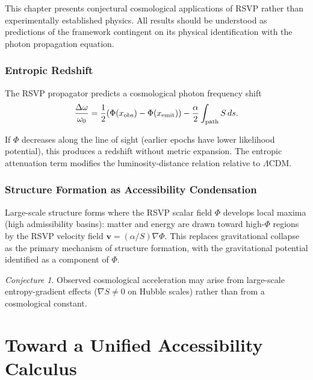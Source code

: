 \documentclass[11pt, openright, twoside]{book}
\theoremstyle{plain}
\theoremstyle{definition}
\theoremstyle{remark}
\newtheorem{conjecture}[theorem]{Conjecture}
\newcommand{\vfield}{\mathbf{v}}
\newcommand{\Sfield}{S}
\begin{document}
\begin{epistbox}
This chapter presents conjectural cosmological applications of RSVP rather than
experimentally established physics. All results should be understood as predictions of
the framework contingent on its physical identification with the photon propagation equation.
\end{epistbox}

\section{Entropic Redshift}

The RSVP propagator predicts a cosmological photon frequency shift
\begin{equation}
  \frac{\Delta\omega}{\omega_0} = \frac{1}{2}(\Phi(x_{\rm obs})-\Phi(x_{\rm emit}))
  - \frac{\alpha}{2}\int_{\rm path}\Sfield\,ds.
\end{equation}

If $\Phi$ decreases along the line of sight (earlier epochs have lower likelihood potential),
this produces a redshift without metric expansion. The entropic attenuation term modifies
the luminosity-distance relation relative to $\Lambda$CDM.

\section{Structure Formation as Accessibility Condensation}

Large-scale structure forms where the RSVP scalar field $\Phi$ develops local maxima
(high admissibility basins): matter and energy are drawn toward high-$\Phi$ regions by
the RSVP velocity field $\vfield=(\alpha/\Sfield)\nabla\Phi$. This replaces gravitational
collapse as the primary mechanism of structure formation, with the gravitational potential
identified as a component of $\Phi$.

\begin{conjecture}
Observed cosmological acceleration may arise from large-scale entropy-gradient effects
($\nabla\Sfield\neq 0$ on Hubble scales) rather than from a cosmological constant.
\end{conjecture}

\part{Toward a Unified Accessibility Calculus}
\end{document}
